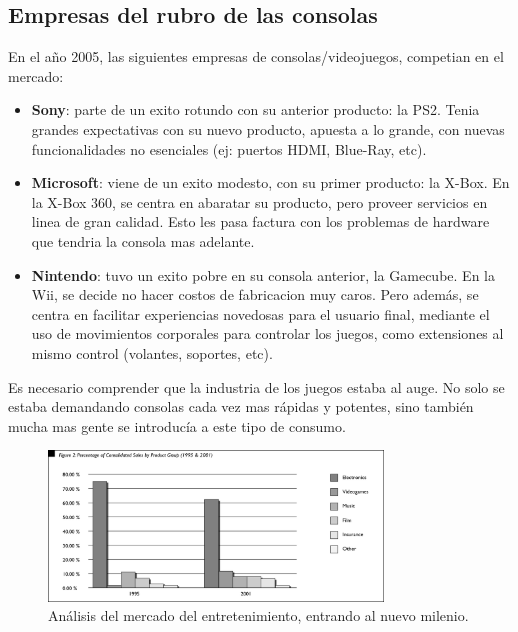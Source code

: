 \documentclass[10pt,compsoc]{IEEEtran}
\begin{document}
	\subsection{Empresas del rubro de las consolas}
	\noindent 
	En el año 2005, las siguientes empresas de consolas/videojuegos, competian en el mercado: 
	\begin{itemize}
		\item{{\bf{Sony}}: parte de un exito rotundo con su anterior producto: la PS2. Tenia grandes expectativas con su nuevo producto, apuesta a lo grande, con nuevas funcionalidades no esenciales (ej: puertos HDMI, Blue-Ray, etc).}
		
		\item{{\bf{Microsoft}}: viene de un exito modesto, con su primer producto: la X-Box. En la X-Box 360, se centra en abaratar su producto, pero proveer servicios en linea de gran calidad. Esto les pasa factura con los problemas de hardware que tendria la consola mas adelante.}
		
		\item{{\bf{Nintendo}}: tuvo un exito pobre en su consola anterior, la Gamecube. En la Wii, se decide no hacer costos de fabricacion muy caros. Pero además, se centra en facilitar experiencias novedosas para el usuario final, mediante el uso de movimientos corporales para controlar los juegos, como extensiones al mismo control (volantes, soportes, etc).}
	\end{itemize}
	
	
	
	Es necesario comprender que la industria de los juegos estaba al auge. No solo se estaba demandando consolas cada vez mas rápidas y potentes, sino también mucha mas gente se introducía a este tipo de consumo.
	

	
	\begin{figure}[H]
	\centering
	\includegraphics[width=3.5in]{imgs/gamingshare.png}
	\caption{Análisis del mercado del entretenimiento, entrando al nuevo milenio.}
	\label{fig2}
	\end{figure}
	
\end{document}
